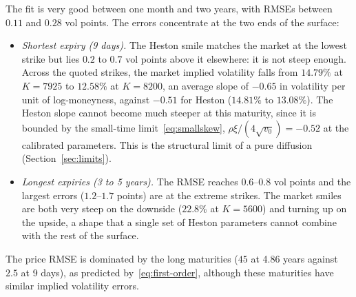 \documentclass[11pt,a4paper]{article}
\theoremstyle{plain}
\theoremstyle{definition}
\begin{document}
The fit is very good between one month and two years, with RMSEs between $0.11$ and $0.28$ vol points. The errors concentrate at the two ends of the surface:
\begin{itemize}
    \item \emph{Shortest expiry (9 days).} The Heston smile matches the market at the lowest strike but lies $0.2$ to $0.7$ vol points above it elsewhere: it is not steep enough. Across the quoted strikes, the market implied volatility falls from $14.79\%$ at $K=7925$ to $12.58\%$ at $K=8200$, an average slope of $-0.65$ in volatility per unit of log-moneyness, against $-0.51$ for Heston ($14.81\%$ to $13.08\%$). The Heston slope cannot become much steeper at this maturity, since it is bounded by the small-time limit~\eqref{eq:smallskew}, $\rho\xi/(4\sqrt{v_0})=-0.52$ at the calibrated parameters. This is the structural limit of a pure diffusion (Section~\ref{sec:limits}).
    \item \emph{Longest expiries (3 to 5 years).} The RMSE reaches $0.6$--$0.8$ vol points and the largest errors ($1.2$--$1.7$ points) are at the extreme strikes. The market smiles are both very steep on the downside ($22.8\%$ at $K=5600$) and turning up on the upside, a shape that a single set of Heston parameters cannot combine with the rest of the surface.
\end{itemize}
The price RMSE is dominated by the long maturities (\texteuro{}$45$ at 4.86 years against \texteuro{}$2.5$ at 9 days), as predicted by~\eqref{eq:first-order}, although these maturities have similar implied volatility errors.




\end{document}
